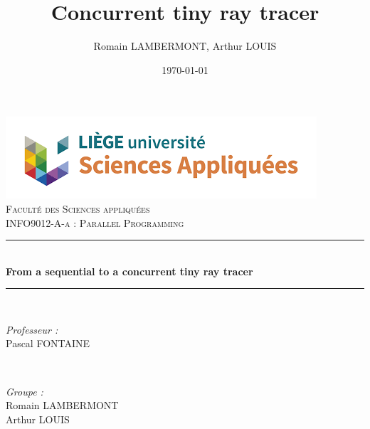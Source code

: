 \documentclass{article}
\begin{document}

\title{Concurrent tiny ray tracer}								%
\author{Romain LAMBERMONT, Arthur LOUIS}								%
\date{\today}											%

\makeatletter
\let\thetitle\@title
\let\theauthor\@author
\let\thedate\@date
\makeatother

\pagestyle{fancy}
\fancyhf{}
\rhead{\theauthor}
\lhead{\thetitle}
\cfoot{\thepage}

\begin{titlepage}
 \centering
 \vspace*{0.5 cm}
 \includegraphics[scale = 0.7]{figs/facsa.png}\\[1.0 cm]	%
 \textsc{\LARGE \newline\newline Faculté des Sciences appliquées}\\[2.0 cm]	%
 \textsc{\Large INFO9012-A-a : Parallel Programming}\\[0.5 cm]				%
 \rule{\linewidth}{0.2 mm} \\[0.4 cm]
 {\huge \bfseries From a sequential to a concurrent tiny ray tracer}\\
 \rule{\linewidth}{0.2 mm} \\[1.5 cm]

 \begin{minipage}{0.5\textwidth}
 	\begin{flushleft} \large
 		\emph{Professeur :}\\
 		  Pascal FONTAINE\\
    \vspace{0.5cm}
 		\end{flushleft}
 		\end{minipage}~
 		\begin{minipage}{0.4\textwidth}

 		\begin{flushright} \large
 		\emph{Groupe :} \\
      Romain LAMBERMONT\\
      Arthur LOUIS\\
 	\end{flushright}

 \end{minipage}\\[2 cm]
 \vspace{5cm}
 \thedate
\end{titlepage}
\end{document}
